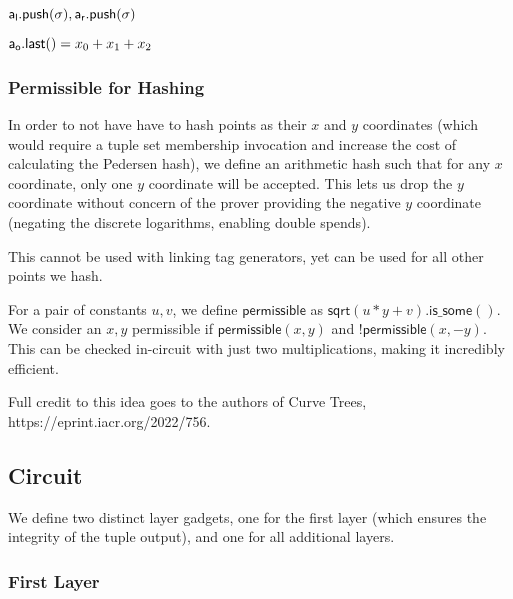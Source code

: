 \documentclass[]{article}
\begin{document}
$\mathsf{a_l.push}(\sigma), \mathsf{a_r.push}(\sigma)$

$\mathsf{a_o.last()} = x_0 + x_1 + x_2$

\subsubsection{Permissible for Hashing}

In order to not have have to hash points as their $x$ and $y$ coordinates (which would require a tuple set membership invocation and increase the cost of calculating the Pedersen hash), we define an arithmetic hash such that for any $x$ coordinate, only one $y$ coordinate will be accepted. This lets us drop the $y$ coordinate without concern of the prover providing the negative $y$ coordinate (negating the discrete logarithms, enabling double spends).

This cannot be used with linking tag generators, yet can be used for all other points we hash.

For a pair of constants $u, v$, we define $\mathsf{permissible}$ as $\mathsf{sqrt}(u * y + v).\mathsf{is\_some}()$. We consider an $x, y$ permissible if $\mathsf{permissible}(x, y)$ and $!\mathsf{permissible}(x, -y)$. This can be checked in-circuit with just two multiplications, making it incredibly efficient.

Full credit to this idea goes to the authors of Curve Trees, https://eprint.iacr.org/2022/756.

\subsection{Circuit}

We define two distinct layer gadgets, one for the first layer (which ensures the integrity of the tuple output), and one for all additional layers.

\subsubsection{First Layer}
\end{document}
